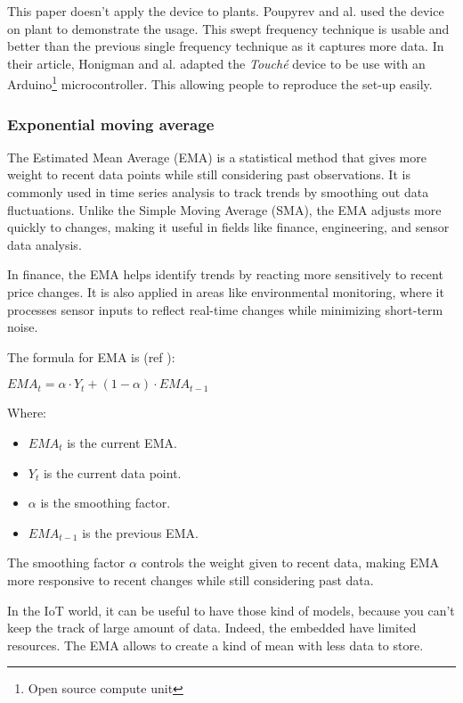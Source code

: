 This paper doesn't apply the device to plants. Poupyrev and al. \cite{poupyrevBotanicusInteracticusInteractive2012}
used the device on plant to demonstrate the usage. This swept frequency technique is usable and better
than the previous single frequency technique as it captures more data.
In their article, Honigman and al. \cite{honigmanTechniquesSweptFrequencyb} adapted the \textit{Touché}
device to be use with an Arduino\footnote{Open source compute unit} microcontroller. This allowing people
to reproduce the set-up easily.

\subsubsection{Exponential moving average}

The Estimated Mean Average (EMA) is a statistical method that gives more weight to recent data points while still considering past observations. It is commonly used in time series analysis to track trends by smoothing out data fluctuations. Unlike the Simple Moving Average (SMA), the EMA adjusts more quickly to changes, making it useful in fields like finance, engineering, and sensor data analysis.

In finance, the EMA helps identify trends by reacting more sensitively to recent price changes. It is also applied in areas like environmental monitoring, where it processes sensor inputs to reflect real-time changes while minimizing short-term noise.

The formula for EMA is (ref \cite{hunter1986exponentially}):

\begin{math}
    EMA_t=\alpha⋅Y_t+(1-\alpha)⋅EMA_{t-1}
    
\end{math}

Where:
\begin{itemize}
    \item $EMA_t$ is the current EMA.
    \item $Y_t$ is the current data point.
    \item $\alpha$ is the smoothing factor.
    \item $EMA_{t-1}$ is the previous EMA.
\end{itemize}


The smoothing factor $\alpha$ controls the weight given to recent data, making EMA more responsive to recent changes while still considering past data.

In the IoT world, it can be useful to have those kind of models, because you can't keep the track of large amount of data. Indeed, the embedded have limited resources. The EMA allows to create a kind of mean with less data to store.


